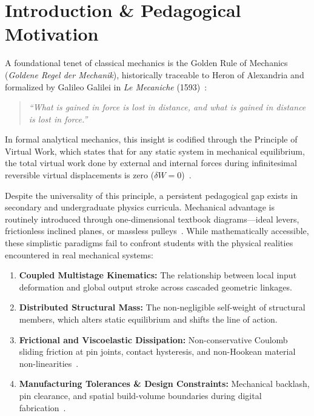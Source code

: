 \documentclass[10pt,twocolumn]{article}
\begin{document}
\section{Introduction \& Pedagogical Motivation}

A foundational tenet of classical mechanics is the Golden Rule of Mechanics (\textit{Goldene Regel der Mechanik}), historically traceable to Heron of Alexandria and formalized by Galileo Galilei in \textit{Le Mecaniche} (1593)~\cite{galileo1593}:
\begin{quote}
\textit{``What is gained in force is lost in distance, and what is gained in distance is lost in force.''}
\end{quote}
In formal analytical mechanics, this insight is codified through the Principle of Virtual Work, which states that for any static system in mechanical equilibrium, the total virtual work done by external and internal forces during infinitesimal reversible virtual displacements is zero ($\delta W = 0$)~\cite{feynman1963,landau1976mechanics}.

Despite the universality of this principle, a persistent pedagogical gap exists in secondary and undergraduate physics curricula. Mechanical advantage is routinely introduced through one-dimensional textbook diagrams---ideal levers, frictionless inclined planes, or massless pulleys~\cite{classic_problems_physics}. While mathematically accessible, these simplistic paradigms fail to confront students with the physical realities encountered in real mechanical systems:
\begin{enumerate}
    \item \textbf{Coupled Multistage Kinematics:} The relationship between local input deformation and global output stroke across cascaded geometric linkages.
    \item \textbf{Distributed Structural Mass:} The non-negligible self-weight of structural members, which alters static equilibrium and shifts the line of action.
    \item \textbf{Frictional and Viscoelastic Dissipation:} Non-conservative Coulomb sliding friction at pin joints, contact hysteresis, and non-Hookean material non-linearities~\cite{ogden1997non}.
    \item \textbf{Manufacturing Tolerances \& Design Constraints:} Mechanical backlash, pin clearance, and spatial build-volume boundaries during digital fabrication~\cite{gibson2015additive}.
\end{enumerate}
\end{document}
